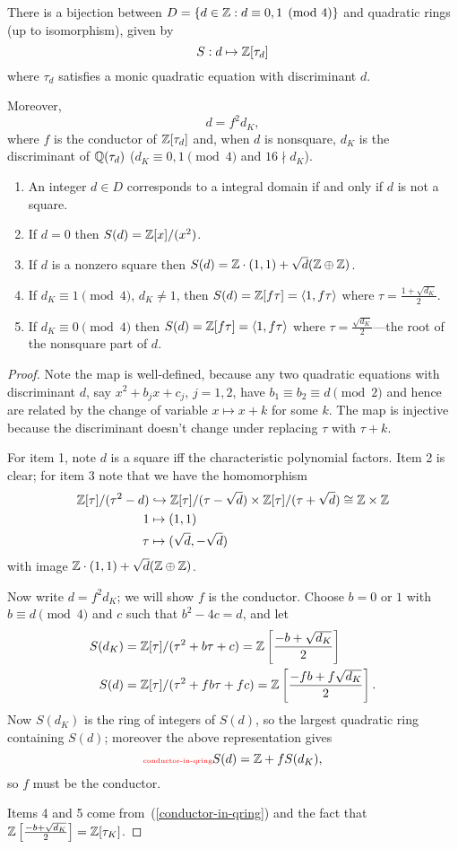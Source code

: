 \begin{pr}
There is a bijection between $D=\left\{{d\in \mathbb{Z}}:{d\equiv 0,1\pmod 4}\right\}$ and quadratic rings (up to isomorphism), given by
\[
S:d\mapsto\mathbb{Z}[\tau_d]
\]
where $\tau_d$ satisfies a monic quadratic equation with discriminant $d$.

Moreover,
\[d=f^2d_K,\]
where $f$ is the conductor of $\mathbb{Z}[\tau_d]$ and, when $d$ is nonsquare, $d_K$ is the discriminant of $\mathbb{Q}(\tau_d)$  ($d_K\equiv 0,1\pmod 4$ and $16\nmid d_K$).
\begin{enumerate}
\item An integer $d\in D$ corresponds to a integral domain if and only if $d$ is not a square.
\item If $d=0$ then $S(d)=\mathbb{Z}[x]/(x^2)$.
\item If $d$ is a nonzero square then $S(d)=\mathbb{Z}\cdot (1,1)+\sqrt{d}(\mathbb{Z}\oplus \mathbb{Z})$.
\item If $d_K\equiv 1\pmod 4$, $d_K\ne 1$, then $S(d)=\mathbb{Z}[f\tau]=\left\langle {1,f\tau}\right\rangle$ where $\tau=\frac{1+\sqrt{d_K}}2$.
\item If $d_K\equiv 0\pmod 4$ then $S(d)=\mathbb{Z}[f\tau]=\left\langle {1,f\tau}\right\rangle$ where $\tau=\frac{\sqrt{d_K}}2$---the root of the nonsquare part of $d$.
\end{enumerate}
\end{pr}
\begin{proof}
Note the map is well-defined, because any two quadratic equations with discriminant $d$, say $x^2+b_jx+c_j$, $j=1,2$, have $b_1\equiv b_2\equiv d\pmod 2$ and hence are related by the change of variable $x\mapsto x+k$ for some $k$. The map is injective because the discriminant doesn't change under replacing $\tau$ with $\tau+k$.

For item 1, note $d$ is a square iff the characteristic polynomial factors. Item 2 is clear; for item 3 note that we have the homomorphism
\begin{align*}
\mathbb{Z}[\tau]/(\tau^2-d)&\hookrightarrow \mathbb{Z}[\tau]/(\tau-\sqrt{d})\times  \mathbb{Z}[\tau]/(\tau+\sqrt{d})\cong\mathbb{Z}\times \mathbb{Z}\\
1&\mapsto (1,1)\\
\tau&\mapsto (\sqrt d,-\sqrt d)
\end{align*}
with image $\mathbb{Z}\cdot (1,1)+\sqrt{d}(\mathbb{Z}\oplus \mathbb{Z})$.

Now write $d=f^2d_K$; we will show $f$ is the conductor. Choose $b=0$ or $1$ with $b\equiv d \pmod 4$ and $c$ such that $b^2-4c=d$, and let 
\begin{align*}
S(d_K)&=\mathbb{Z}[\tau]/(\tau^2+b\tau+c)=\mathbb{Z}\left[ {\frac{-b+\sqrt{d_K}}2} \right]\\
S(d)&=\mathbb{Z}[\tau]/(\tau^2+fb\tau+fc)=\mathbb{Z}\left[ {\frac{-fb+f\sqrt{d_K}}2} \right]. 
\end{align*}
Now $S(d_K)$ is the ring of integers of $S(d)$, so the largest quadratic ring containing $S(d)$; moreover the above representation gives
\begin{equation}\llabel{conductor-in-qring}
S(d)=\Z+fS(d_K),
\end{equation}
so $f$ must be the conductor.

Items 4 and 5 come from~(\ref{conductor-in-qring}) and the fact that $\mathbb{Z}\left[ {\frac{-b+\sqrt{d_K}}2} \right]=\mathbb{Z}[\tau_K]$.
\end{proof}
